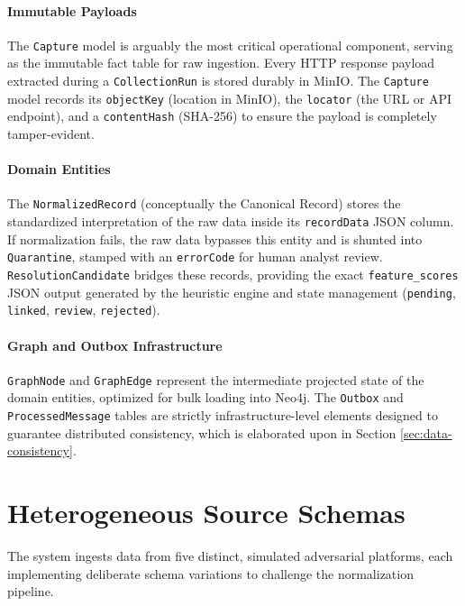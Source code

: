 \paragraph{Immutable Payloads}
The \texttt{Capture} model is arguably the most critical operational component, serving as the immutable fact table for raw ingestion. Every HTTP response payload extracted during a \texttt{CollectionRun} is stored durably in MinIO. The \texttt{Capture} model records its \texttt{objectKey} (location in MinIO), the \texttt{locator} (the URL or API endpoint), and a \texttt{contentHash} (SHA-256) to ensure the payload is completely tamper-evident.

\paragraph{Domain Entities}
The \texttt{NormalizedRecord} (conceptually the Canonical Record) stores the standardized interpretation of the raw data inside its \texttt{recordData} JSON column. If normalization fails, the raw data bypasses this entity and is shunted into \texttt{Quarantine}, stamped with an \texttt{errorCode} for human analyst review. \texttt{ResolutionCandidate} bridges these records, providing the exact \texttt{feature\_scores} JSON output generated by the heuristic engine and state management (\texttt{pending}, \texttt{linked}, \texttt{review}, \texttt{rejected}).

\paragraph{Graph and Outbox Infrastructure}
\texttt{GraphNode} and \texttt{GraphEdge} represent the intermediate projected state of the domain entities, optimized for bulk loading into Neo4j. The \texttt{Outbox} and \texttt{ProcessedMessage} tables are strictly infrastructure-level elements designed to guarantee distributed consistency, which is elaborated upon in Section \ref{sec:data-consistency}.

\section{Heterogeneous Source Schemas}
\label{sec:data-source-schemas}
The system ingests data from five distinct, simulated adversarial platforms, each implementing deliberate schema variations to challenge the normalization pipeline.

